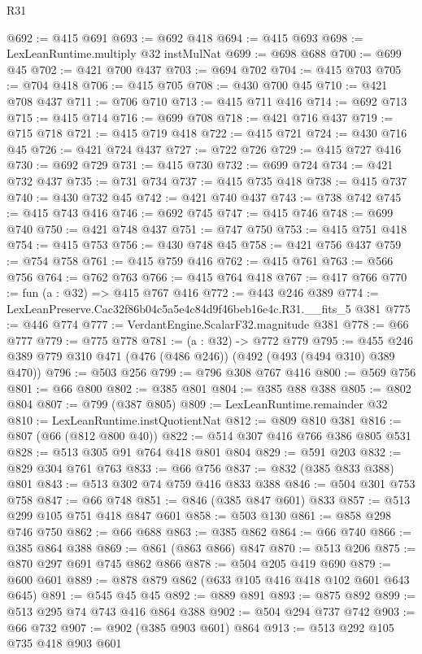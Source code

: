 \begin{lexlean}{R31}
\begin{coremodule}
@692 := @415 @691
@693 := @692 @418
@694 := @415 @693
@698 := LexLeanRuntime.multiply @32 instMulNat
@699 := @698 @688
@700 := @699 @45
@702 := @421 @700 @437
@703 := @694 @702
@704 := @415 @703
@705 := @704 @418
@706 := @415 @705
@708 := @430 @700 @45
@710 := @421 @708 @437
@711 := @706 @710
@713 := @415 @711 @416
@714 := @692 @713
@715 := @415 @714
@716 := @699 @708
@718 := @421 @716 @437
@719 := @715 @718
@721 := @415 @719 @418
@722 := @415 @721
@724 := @430 @716 @45
@726 := @421 @724 @437
@727 := @722 @726
@729 := @415 @727 @416
@730 := @692 @729
@731 := @415 @730
@732 := @699 @724
@734 := @421 @732 @437
@735 := @731 @734
@737 := @415 @735 @418
@738 := @415 @737
@740 := @430 @732 @45
@742 := @421 @740 @437
@743 := @738 @742
@745 := @415 @743 @416
@746 := @692 @745
@747 := @415 @746
@748 := @699 @740
@750 := @421 @748 @437
@751 := @747 @750
@753 := @415 @751 @418
@754 := @415 @753
@756 := @430 @748 @45
@758 := @421 @756 @437
@759 := @754 @758
@761 := @415 @759 @416
@762 := @415 @761
@763 := @566 @756
@764 := @762 @763
@766 := @415 @764 @418
@767 := @417 @766
@770 := fun (a : @32) => @415 @767 @416
@772 := @443 @246 @389
@774 := LexLeanPreserve.Cac32f86b04c5a5e4c84d9f46beb16e4c.R31.__fits_5 @381
@775 := @446 @774
@777 := VerdantEngine.ScalarF32.magnitude @381
@778 := @66 @777
@779 := @775 @778
@781 := (a : @32) -> @772 @779
@795 := @455 @246 @389 @779 @310 @471 (@476 (@486 @246)) (@492 (@493 (@494 @310) @389 @470))
@796 := @503 @256
@799 := @796 @308 @767 @416
@800 := @569 @756
@801 := @66 @800
@802 := @385 @801
@804 := @385 @88 @388
@805 := @802 @804
@807 := @799 (@387 @805)
@809 := LexLeanRuntime.remainder @32
@810 := LexLeanRuntime.instQuotientNat
@812 := @809 @810 @381
@816 := @807 (@66 (@812 @800 @40))
@822 := @514 @307 @416 @766 @386 @805 @531
@828 := @513 @305 @91 @764 @418 @801 @804
@829 := @591 @203
@832 := @829 @304 @761 @763
@833 := @66 @756
@837 := @832 (@385 @833 @388) @801
@843 := @513 @302 @74 @759 @416 @833 @388
@846 := @504 @301 @753 @758
@847 := @66 @748
@851 := @846 (@385 @847 @601) @833
@857 := @513 @299 @105 @751 @418 @847 @601
@858 := @503 @130
@861 := @858 @298 @746 @750
@862 := @66 @688
@863 := @385 @862
@864 := @66 @740
@866 := @385 @864 @388
@869 := @861 (@863 @866) @847
@870 := @513 @206
@875 := @870 @297 @691 @745 @862 @866
@878 := @504 @205 @419 @690
@879 := @600 @601
@889 := @878 @879 @862 (@633 @105 @416 @418 @102 @601 @643 @645)
@891 := @545 @45 @45
@892 := @889 @891
@893 := @875 @892
@899 := @513 @295 @74 @743 @416 @864 @388
@902 := @504 @294 @737 @742
@903 := @66 @732
@907 := @902 (@385 @903 @601) @864
@913 := @513 @292 @105 @735 @418 @903 @601

\end{coremodule}
\end{lexlean}
